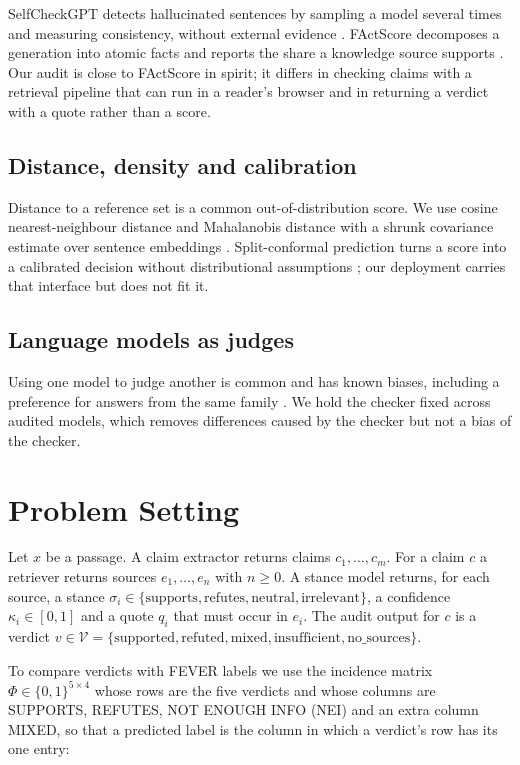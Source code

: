 \documentclass[11pt,a4paper]{article}
\begin{document}
SelfCheckGPT detects hallucinated sentences by sampling a model several times and measuring consistency, without external evidence \citep{manakul2023}. FActScore decomposes a generation into atomic facts and reports the share a knowledge source supports \citep{min2023}. Our audit is close to FActScore in spirit; it differs in checking claims with a retrieval pipeline that can run in a reader's browser and in returning a verdict with a quote rather than a score.

\subsection{Distance, density and calibration}

Distance to a reference set is a common out-of-distribution score. We use cosine nearest-neighbour distance and Mahalanobis distance \citep{mahalanobis1936} with a shrunk covariance estimate \citep{ledoit2004} over sentence embeddings \citep{reimers2019,wang2020}. Split-conformal prediction turns a score into a calibrated decision without distributional assumptions \citep{angelopoulos2021}; our deployment carries that interface but does not fit it.

\subsection{Language models as judges}

Using one model to judge another is common and has known biases, including a preference for answers from the same family \citep{zheng2023}. We hold the checker fixed across audited models, which removes differences caused by the checker but not a bias of the checker.

\section{Problem Setting}

Let $x$ be a passage. A claim extractor returns claims $c_1,\dots,c_m$. For a claim $c$ a retriever returns sources $e_1,\dots,e_n$ with $n \ge 0$. A stance model returns, for each source, a stance $\sigma_i \in \{\text{supports},\text{refutes},\text{neutral},\text{irrelevant}\}$, a confidence $\kappa_i \in [0,1]$ and a quote $q_i$ that must occur in $e_i$. The audit output for $c$ is a verdict $v \in \mathcal{V} = \{\text{supported},\text{refuted},\text{mixed},\text{insufficient},\text{no\_sources}\}$.

To compare verdicts with FEVER labels we use the incidence matrix $\Phi \in \{0,1\}^{5 \times 4}$ whose rows are the five verdicts and whose columns are SUPPORTS, REFUTES, NOT ENOUGH INFO (NEI) and an extra column MIXED, so that a predicted label is the column in which a verdict's row has its one entry:
\end{document}
